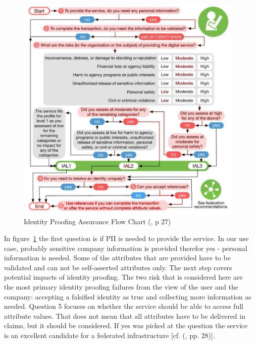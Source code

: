 \begin{figure}[h]
	\centering
	\includegraphics[width=0.9\linewidth]{images/ial_flow}
	\caption{Identity Proofing Assurance Flow Chart (\cite{NIST:2017:DIG}, p 27)}
	\label{fig:ialflow}
\end{figure}

In figure~\ref{fig:ialflow} the first question is if PII is needed to provide the service. In our use case, probably sensitive company information is provided therefor yes - personal information is needed. Some of the attributes that are provided have to be validated and can not be self-asserted attributes only. The next step covers potential impacts of identity proofing. The two risk that is considered here are the most primary identity proofing failures from the view of the user and the company: accepting a falsified identity as true and collecting more information as needed. Question 5 focuses on whether the service should be able to access full attribute values. That does not mean that all attributes have to be delivered in claims, but it should be considered. If yes was picked at the question the service is an excellent candidate for a federated infrastructure [cf. (\cite{NIST:2017:DIG}, pp. 28)]. 


